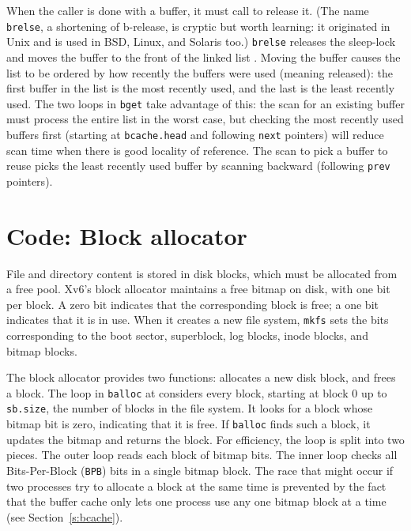When the caller is done with a buffer,
it must call
to release it. 
(The name
\lstinline{brelse},
a shortening of
b-release,
is cryptic but worth learning:
it originated in Unix and is used in BSD, Linux, and Solaris too.)
\lstinline{brelse}
releases the sleep-lock and
moves the buffer
to the front of the linked list
.
Moving the buffer causes the
list to be ordered by how recently the buffers were used (meaning released):
the first buffer in the list is the most recently used,
and the last is the least recently used.
The two loops in
\lstinline{bget}
take advantage of this:
the scan for an existing buffer must process the entire list
in the worst case, but checking the most recently used buffers
first (starting at
\lstinline{bcache.head}
and following
\lstinline{next}
pointers) will reduce scan time when there is good locality of reference.
The scan to pick a buffer to reuse picks the least recently used
buffer by scanning backward
(following 
\lstinline{prev}
pointers).
\section{Code: Block allocator}

File and directory content is stored in disk blocks,
which must be allocated from a free pool.
Xv6's block allocator
maintains a free bitmap on disk, with one bit per block. 
A zero bit indicates that the corresponding block is free;
a one bit indicates that it is in use.
When it creates a new file system,
\lstinline{mkfs}
sets the bits corresponding to the boot sector, superblock, log blocks, inode
blocks, and bitmap blocks.

The block allocator provides two functions:
allocates a new disk block, and
frees a block.
The loop in
\lstinline{balloc}
at
considers every block, starting at block 0 up to 
\lstinline{sb.size},
the number of blocks in the file system.
It looks for a block whose bitmap bit is zero,
indicating that it is free.
If
\lstinline{balloc}
finds such a block, it updates the bitmap 
and returns the block.
For efficiency, the loop is split into two 
pieces.
The outer loop reads each block of bitmap bits.
The inner loop checks all 
Bits-Per-Block (\lstinline{BPB})
bits in a single bitmap block.
The race that might occur if two processes try to allocate
a block at the same time is prevented by the fact that
the buffer cache only lets one process use any one bitmap block at a
time (see Section~\ref{s:bcache}).

